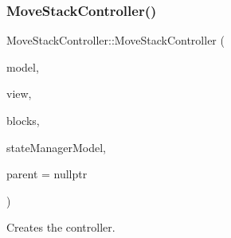 \subsubsection{\texorpdfstring{MoveStackController()}{MoveStackController()}}
{\footnotesize\ttfamily Move\+Stack\+Controller\+::\+Move\+Stack\+Controller (\begin{DoxyParamCaption}\item[{\mbox{\hyperlink{class_move_stack_model}{Move\+Stack\+Model}} \&}]{model,  }\item[{\mbox{\hyperlink{class_move_stack_view}{Move\+Stack\+View}} \&}]{view,  }\item[{\mbox{\hyperlink{class_blocks_model}{Blocks\+Model}} \&}]{blocks,  }\item[{\mbox{\hyperlink{class_state_manager_model}{State\+Manager\+Model}} \&}]{state\+Manager\+Model,  }\item[{Q\+Object $\ast$}]{parent = {\ttfamily nullptr} }\end{DoxyParamCaption})\hspace{0.3cm}{\ttfamily [explicit]}}



Creates the controller. 


